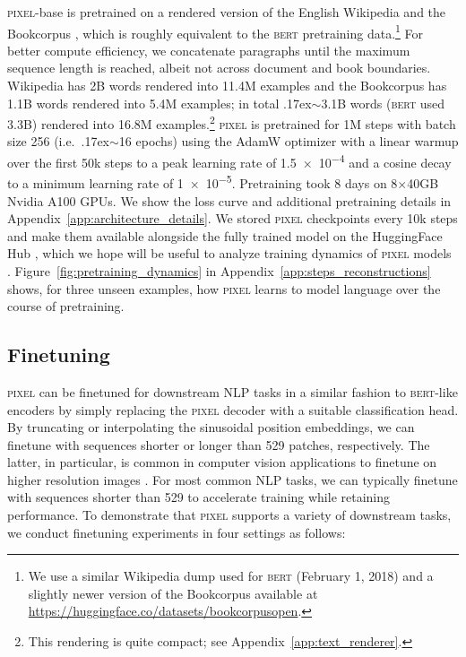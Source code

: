 \documentclass{article}
\newcommand{\model}{\textsc{pixel}\xspace}
\newcommand{\circa}{{\raise.17ex\hbox{$\scriptstyle\sim$}}}
\begin{document}
\model-base is pretrained on a rendered version of the English Wikipedia and the Bookcorpus \citep{Zhu_2015_ICCV}, which is roughly equivalent to the \textsc{bert} pretraining data.\footnote{We use a similar Wikipedia dump \citet{devlin-etal-2019-bert} used for \textsc{bert} (February 1, 2018) and a slightly newer version of the Bookcorpus available at \url{https://huggingface.co/datasets/bookcorpusopen}.} For better compute efficiency, we concatenate paragraphs until the maximum sequence length is reached, albeit not across document and book boundaries. Wikipedia has 2B words rendered into 11.4M examples and the Bookcorpus has 1.1B words rendered into 5.4M examples; in total \circa3.1B words (\textsc{bert} used 3.3B) rendered into 16.8M examples.\footnote{This rendering is quite compact; see Appendix~\ref{app:text_renderer}.} \model is pretrained for 1M steps with batch size 256 (i.e.\ \circa16 epochs) using the AdamW optimizer \citep{kingma-ba-2015-adam, loshchilov2018decoupled} with a linear warmup over the first 50k steps to a peak learning rate of \num{1.5e-4} and a cosine decay to a minimum learning rate of \num{1e-5}. Pretraining took 8 days on 8$\times$40GB Nvidia A100 GPUs. We show the loss curve
and additional pretraining details in Appendix~\ref{app:architecture_details}. We stored \model checkpoints every 10k steps and make them available alongside the fully trained model on the HuggingFace Hub \citep{wolf-etal-2020-transformers},
which we hope will be useful to analyze training dynamics of \model models \citep{sellam2022the}. Figure~\ref{fig:pretraining_dynamics} in Appendix~\ref{app:steps_reconstructions} shows, for three unseen examples, how \model learns to model language over the course of pretraining.

\vspace{-2mm}
\subsection{Finetuning}
\label{sec:finetuning}
\vspace{-2mm}

\model can be finetuned for downstream NLP tasks in a similar fashion to \textsc{bert}-like encoders by simply replacing the \model decoder with a suitable classification head. By truncating or interpolating the sinusoidal position embeddings, we can finetune with sequences shorter or longer than 529 patches, respectively. The latter, in particular, is common in computer vision applications to finetune on higher resolution images \citep{touvron-etal-2019, kolesnikov-etal-2020, dosovitskiy2021an, he-etal-2022-mae}. For most common NLP tasks, we can typically finetune with sequences shorter than 529 to accelerate training while retaining performance. To demonstrate that \model supports a variety of downstream tasks, we conduct finetuning experiments in four settings as follows:
\end{document}

